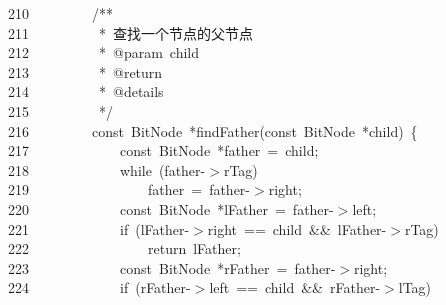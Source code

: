 \documentclass[11pt,a4paper]{ctexart}
\newcommand{\hlstd}[1]{\textcolor[rgb]{0.2,0.2,0.2}{#1}}
\newcommand{\hlcom}[1]{\textcolor[rgb]{0.59,0.59,0.59}{#1}}
\newcommand{\hlopt}[1]{\textcolor[rgb]{0.2,0.2,0.2}{#1}}
\newcommand{\hllin}[1]{\textcolor[rgb]{0.59,0.59,0.59}{#1}}
\newcommand{\hlkwa}[1]{\textcolor[rgb]{0.23,0.42,0.78}{#1}}
\newcommand{\hlkwb}[1]{\textcolor[rgb]{0.63,0,0.31}{#1}}
\newcommand{\hlkwd}[1]{\textcolor[rgb]{0.78,0.23,0.41}{#1}}
\begin{document}
\hllin{210\ }\hlstd{}\hlstd{\ \ \ \ \ \ \ \ }\hlstd{}\hlcom{/{*}{*}}\\
\hllin{211\ }\hlcom{}\hlstd{\ \ \ \ \ \ \ \ \ }\hlcom{{*}\ 查找一个节点的父节点}\\
\hllin{212\ }\hlcom{}\hlstd{\ \ \ \ \ \ \ \ \ }\hlcom{{*}\ @param\ child}\\
\hllin{213\ }\hlcom{}\hlstd{\ \ \ \ \ \ \ \ \ }\hlcom{{*}\ @return}\\
\hllin{214\ }\hlcom{}\hlstd{\ \ \ \ \ \ \ \ \ }\hlcom{{*}\ @details}\\
\hllin{215\ }\hlcom{}\hlstd{\ \ \ \ \ \ \ \ \ }\hlcom{{*}/}\hlstd{}\\
\hllin{216\ }\hlstd{}\hlstd{\ \ \ \ \ \ \ \ }\hlstd{}\hlkwb{const\ }\hlstd{BitNode\ }\hlopt{{*}}\hlstd{}\hlkwd{findFather}\hlstd{}\hlopt{(}\hlstd{}\hlkwb{const\ }\hlstd{BitNode\ }\hlopt{{*}}\hlstd{child}\hlopt{)\ \{}\\
\hllin{217\ }\hlstd{}\hlstd{\ \ \ \ \ \ \ \ \ \ \ \ }\hlstd{}\hlkwb{const\ }\hlstd{BitNode\ }\hlopt{{*}}\hlstd{father\ }\hlopt{=\ }\hlstd{child}\hlopt{;}\\
\hllin{218\ }\hlstd{}\hlstd{\ \ \ \ \ \ \ \ \ \ \ \ }\hlstd{}\hlkwa{while\ }\hlstd{}\hlopt{(}\hlstd{father}\hlopt{{-}$>$}\hlstd{rTag}\hlopt{)}\\
\hllin{219\ }\hlstd{}\hlstd{\ \ \ \ \ \ \ \ \ \ \ \ \ \ \ \ }\hlstd{father\ }\hlopt{=\ }\hlstd{father}\hlopt{{-}$>$}\hlstd{right}\hlopt{;}\\
\hllin{220\ }\hlstd{}\hlstd{\ \ \ \ \ \ \ \ \ \ \ \ }\hlstd{}\hlkwb{const\ }\hlstd{BitNode\ }\hlopt{{*}}\hlstd{lFather\ }\hlopt{=\ }\hlstd{father}\hlopt{{-}$>$}\hlstd{left}\hlopt{;}\\
\hllin{221\ }\hlstd{}\hlstd{\ \ \ \ \ \ \ \ \ \ \ \ }\hlstd{}\hlkwa{if\ }\hlstd{}\hlopt{(}\hlstd{lFather}\hlopt{{-}$>$}\hlstd{right\ }\hlopt{==\ }\hlstd{child\ }\hlopt{\&\&\ }\hlstd{lFather}\hlopt{{-}$>$}\hlstd{rTag}\hlopt{)}\\
\hllin{222\ }\hlstd{}\hlstd{\ \ \ \ \ \ \ \ \ \ \ \ \ \ \ \ }\hlstd{}\hlkwa{return\ }\hlstd{lFather}\hlopt{;}\\
\hllin{223\ }\hlstd{}\hlstd{\ \ \ \ \ \ \ \ \ \ \ \ }\hlstd{}\hlkwb{const\ }\hlstd{BitNode\ }\hlopt{{*}}\hlstd{rFather\ }\hlopt{=\ }\hlstd{father}\hlopt{{-}$>$}\hlstd{right}\hlopt{;}\\
\hllin{224\ }\hlstd{}\hlstd{\ \ \ \ \ \ \ \ \ \ \ \ }\hlstd{}\hlkwa{if\ }\hlstd{}\hlopt{(}\hlstd{rFather}\hlopt{{-}$>$}\hlstd{left\ }\hlopt{==\ }\hlstd{child\ }\hlopt{\&\&\ }\hlstd{rFather}\hlopt{{-}$>$}\hlstd{lTag}\hlopt{)}\\
\end{document}
